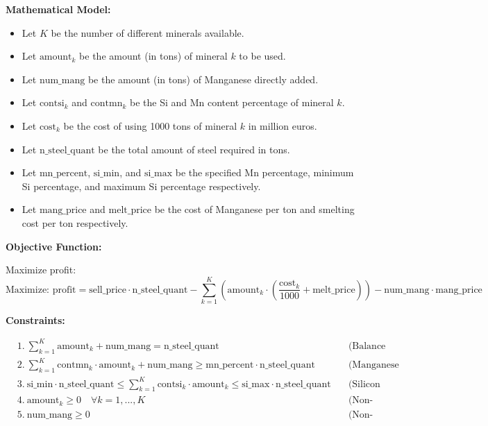 \documentclass{article}
\begin{document}
\textbf{Mathematical Model:}

\begin{itemize}
    \item Let \( K \) be the number of different minerals available.
    \item Let \( \text{amount}_k \) be the amount (in tons) of mineral \( k \) to be used.
    \item Let \( \text{num\_mang} \) be the amount (in tons) of Manganese directly added.
    \item Let \( \text{contsi}_k \) and \( \text{contmn}_k \) be the Si and Mn content percentage of mineral \( k \).
    \item Let \( \text{cost}_k \) be the cost of using 1000 tons of mineral \( k \) in million euros.
    \item Let \( \text{n\_steel\_quant} \) be the total amount of steel required in tons.
    \item Let \( \text{mn\_percent} \), \( \text{si\_min} \), and \( \text{si\_max} \) be the specified Mn percentage, minimum Si percentage, and maximum Si percentage respectively.
    \item Let \( \text{mang\_price} \) and \( \text{melt\_price} \) be the cost of Manganese per ton and smelting cost per ton respectively.

\end{itemize}

\textbf{Objective Function:}

Maximize profit:
\[
\text{Maximize: } \text{profit} = \text{sell\_price} \cdot \text{n\_steel\_quant} - \sum_{k=1}^{K} \left( \text{amount}_k \cdot \left(\frac{\text{cost}_k}{1000} + \text{melt\_price}\right) \right) - \text{num\_mang} \cdot \text{mang\_price}
\]

\textbf{Constraints:}

\begin{align*}
& 1. \ \sum_{k=1}^{K} \text{amount}_k + \text{num\_mang} = \text{n\_steel\_quant} \quad &\text{(Balance constraint for total steel quantity)} \\
& 2. \ \sum_{k=1}^{K} \text{contmn}_k \cdot \text{amount}_k + \text{num\_mang} \geq \text{mn\_percent} \cdot \text{n\_steel\_quant} \quad &\text{(Manganese content requirement)} \\
& 3. \ \text{si\_min} \cdot \text{n\_steel\_quant} \leq \sum_{k=1}^{K} \text{contsi}_k \cdot \text{amount}_k \leq \text{si\_max} \cdot \text{n\_steel\_quant} \quad &\text{(Silicon content requirement)} \\
& 4. \ \text{amount}_k \geq 0 \quad \forall k=1,...,K \quad &\text{(Non-negativity for minerals)} \\
& 5. \ \text{num\_mang} \geq 0 \quad &\text{(Non-negativity for Manganese)}
\end{align*}
\end{document}
